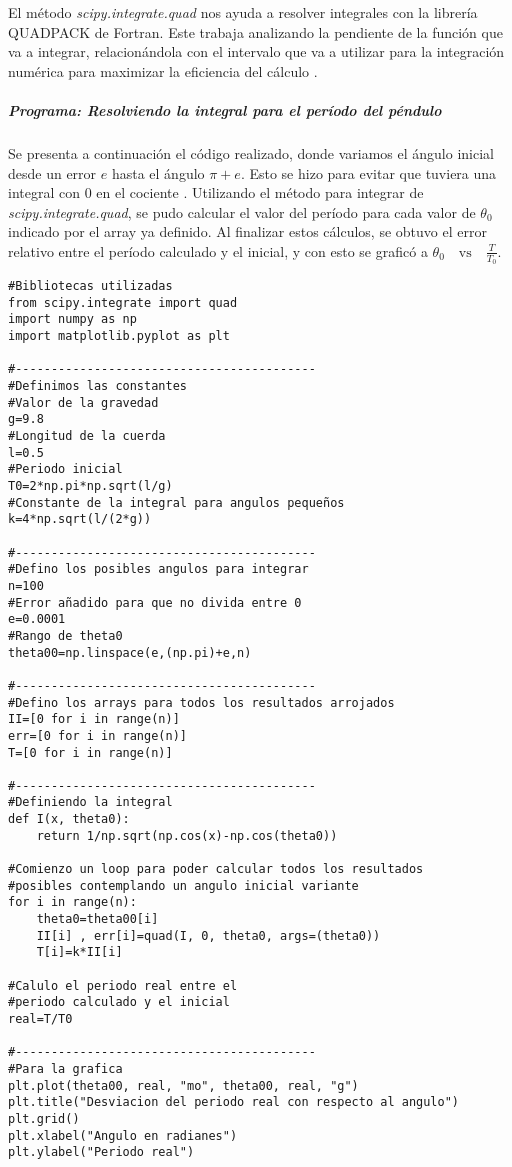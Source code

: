 \documentclass[12pt]{article}
\begin{document}
El método \textit{scipy.integrate.quad} \cite{S1} nos ayuda a resolver integrales con la librería  QUADPACK de Fortran. Este trabaja analizando la pendiente de la función que va a integrar, relacionándola con el intervalo que va a utilizar para la integración numérica para maximizar la eficiencia del cálculo \cite{SO}.

\subparagraph*{Programa: Resolviendo la integral para el período del péndulo}

Se presenta a continuación el código realizado, donde variamos el ángulo inicial desde un error $e$ hasta el ángulo $\pi+e$. Esto se hizo para evitar que tuviera una integral con 0 en el cociente \cite{M}. Utilizando el método para integrar de \textit{scipy.integrate.quad}, se pudo calcular el valor del período para cada valor de $\theta_0$ indicado por el array ya definido. Al finalizar estos cálculos, se obtuvo el error relativo entre el período calculado y el inicial, y con esto se graficó a $\displaystyle \theta_0 \quad \text{vs} \quad \frac{T}{T_0}$.

\begin{verbatim}
#Bibliotecas utilizadas
from scipy.integrate import quad
import numpy as np
import matplotlib.pyplot as plt

#------------------------------------------
#Definimos las constantes 
#Valor de la gravedad
g=9.8        
#Longitud de la cuerda
l=0.5          
#Periodo inicial
T0=2*np.pi*np.sqrt(l/g)
#Constante de la integral para angulos pequeños
k=4*np.sqrt(l/(2*g))

#------------------------------------------
#Defino los posibles angulos para integrar
n=100
#Error añadido para que no divida entre 0
e=0.0001
#Rango de theta0 
theta00=np.linspace(e,(np.pi)+e,n) 

#------------------------------------------
#Defino los arrays para todos los resultados arrojados
II=[0 for i in range(n)]
err=[0 for i in range(n)]
T=[0 for i in range(n)]

#------------------------------------------
#Definiendo la integral
def I(x, theta0):
    return 1/np.sqrt(np.cos(x)-np.cos(theta0))

#Comienzo un loop para poder calcular todos los resultados 
#posibles contemplando un angulo inicial variante
for i in range(n):
    theta0=theta00[i]
    II[i] , err[i]=quad(I, 0, theta0, args=(theta0))
    T[i]=k*II[i]

#Calulo el periodo real entre el
#periodo calculado y el inicial
real=T/T0

#------------------------------------------    
#Para la grafica
plt.plot(theta00, real, "mo", theta00, real, "g")
plt.title("Desviacion del periodo real con respecto al angulo")
plt.grid()
plt.xlabel("Angulo en radianes")
plt.ylabel("Periodo real")
\end{verbatim}
\end{document}
